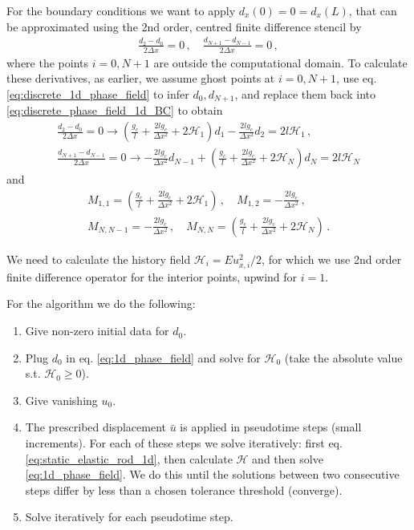 \documentclass[11pt,a4paper]{article}
\begin{document}
For the boundary conditions we want to apply $d_x(0) = 0 = d_x(L)$, that can be approximated using the 2nd order, centred finite difference stencil by
\begin{align}
    \frac{d_2 - d_0}{2\Delta x} = 0
    \,, \quad
    \frac{d_{N+1} - d_{N-1}}{2\Delta x} = 0
    \,,
    \label{eq:discrete_phase_field_1d_BC}
\end{align}
where the points $i=0,N+1$ are outside the computational domain. To calculate these derivatives, as earlier, we assume ghost points at $i=0,N+1$, use eq. \eqref{eq:discrete_1d_phase_field} to infer $d_0, d_{N+1}$, and replace them back into \eqref{eq:discrete_phase_field_1d_BC} to obtain
\begin{align*}
    \frac{d_2 - d_0}{2 \Delta x} = 0
    \rightarrow
    \left( \frac{g_c}{l} + \frac{2 l g_c}{\Delta x^2} + 2 \mathcal{H}_1 \right) d_1 
    - \frac{2 l g_c}{\Delta x^2} d_2 = 2 l \mathcal{H}_1
    \,,
    \\
    \frac{d_{N+1} - d_{N-1}}{2 \Delta x} = 0
    \rightarrow
    - \frac{2 l g_c}{\Delta x^2} d_{N-1}
    + \left( \frac{g_c}{l} + \frac{2 l g_c}{\Delta x^2} + 2 \mathcal{H}_N \right) d_N 
     = 2 l \mathcal{H}_N
\end{align*}
and
\begin{align*}
    M_{1,1} = \left( \frac{g_c}{l} + \frac{2 l g_c}{\Delta x^2} + 2 \mathcal{H}_1 \right) 
    \,, \quad 
    M_{1,2} = - \frac{2 l g_c}{\Delta x^2} 
    \,, \\
    M_{N,N-1} = - \frac{2 l g_c}{\Delta x^2}
    \,, \quad
    M_{N,N} = \left( \frac{g_c}{l} + \frac{2 l g_c}{\Delta x^2} + 2 \mathcal{H}_N \right)
    \,.
\end{align*}

We need to calculate the history field $\mathcal{H}_i = E u_{x,i}^2/2$, for which we use 2nd order finite difference operator for the interior points, upwind for $i=1$.


For the algorithm we do the following:
\begin{enumerate}
    \item Give non-zero initial data for $d_0$.
    \item Plug $d_0$ in eq. \eqref{eq:1d_phase_field} and solve for $\mathcal{H}_0$ (take the absolute value s.t. $\mathcal{H}_0 \geq 0$).
    \item Give vanishing $u_0$.
    \item The prescribed displacement $\bar{u}$ is applied in pseudotime steps (small increments). For each of these steps we solve iteratively: first eq. \eqref{eq:static_elastic_rod_1d}, then calculate $\mathcal{H}$ and then solve \eqref{eq:1d_phase_field}. We do this until the solutions between two consecutive steps differ by less than a chosen tolerance threshold (converge).
    \item Solve iteratively for each pseudotime step.
\end{enumerate}
\end{document}
